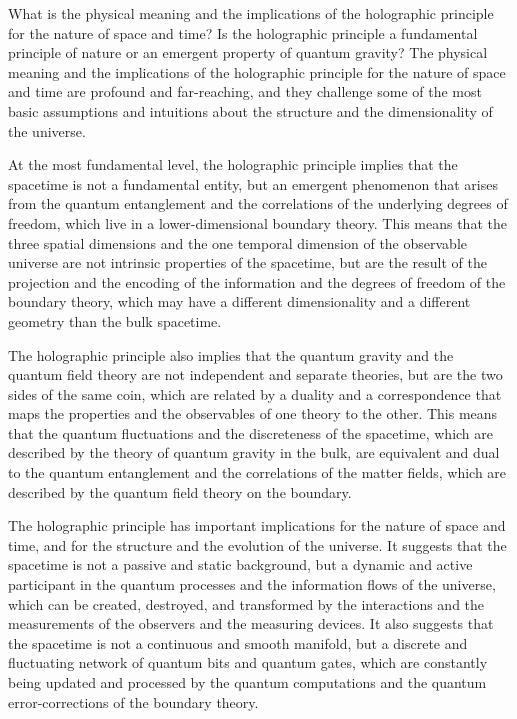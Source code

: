 \begin{tcolorbox}[colback=green!5!white,colframe=green!75!black,title=Question]
What is the physical meaning and the implications of the holographic principle for the nature of space and time? Is the holographic principle a fundamental principle of nature or an emergent property of quantum gravity?
\tcblower
The physical meaning and the implications of the holographic principle for the nature of space and time are profound and far-reaching, and they challenge some of the most basic assumptions and intuitions about the structure and the dimensionality of the universe.

At the most fundamental level, the holographic principle implies that the spacetime is not a fundamental entity, but an emergent phenomenon that arises from the quantum entanglement and the correlations of the underlying degrees of freedom, which live in a lower-dimensional boundary theory. This means that the three spatial dimensions and the one temporal dimension of the observable universe are not intrinsic properties of the spacetime, but are the result of the projection and the encoding of the information and the degrees of freedom of the boundary theory, which may have a different dimensionality and a different geometry than the bulk spacetime.

The holographic principle also implies that the quantum gravity and the quantum field theory are not independent and separate theories, but are the two sides of the same coin, which are related by a duality and a correspondence that maps the properties and the observables of one theory to the other. This means that the quantum fluctuations and the discreteness of the spacetime, which are described by the theory of quantum gravity in the bulk, are equivalent and dual to the quantum entanglement and the correlations of the matter fields, which are described by the quantum field theory on the boundary.

The holographic principle has important implications for the nature of space and time, and for the structure and the evolution of the universe. It suggests that the spacetime is not a passive and static background, but a dynamic and active participant in the quantum processes and the information flows of the universe, which can be created, destroyed, and transformed by the interactions and the measurements of the observers and the measuring devices. It also suggests that the spacetime is not a continuous and smooth manifold, but a discrete and fluctuating network of quantum bits and quantum gates, which are constantly being updated and processed by the quantum computations and the quantum error-corrections of the boundary theory.


\end{tcolorbox}
